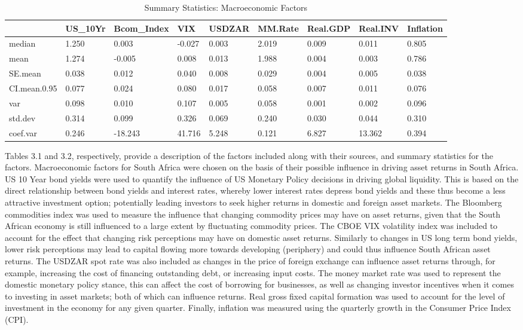\documentclass[11pt,preprint, authoryear]{elsarticle}
\numberwithin{equation}{section}
\numberwithin{figure}{section}
\numberwithin{table}{section}
\begin{document}
\begin{longtable}[t]{l|l|l|l|l|l|l|l|l}
\caption{\label{tab:Descriptive Stats}Summary Statistics: Macroeconomic Factors}\\
\hline
  & US\_10Yr & Bcom\_Index & VIX & USDZAR & MM.Rate & Real.GDP & Real.INV & Inflation\\
\hline
median & 1.250 & 0.003 & -0.027 & 0.003 & 2.019 & 0.009 & 0.011 & 0.805\\
\hline
mean & 1.274 & -0.005 & 0.008 & 0.013 & 1.988 & 0.004 & 0.003 & 0.786\\
\hline
SE.mean & 0.038 & 0.012 & 0.040 & 0.008 & 0.029 & 0.004 & 0.005 & 0.038\\
\hline
CI.mean.0.95 & 0.077 & 0.024 & 0.080 & 0.017 & 0.058 & 0.007 & 0.011 & 0.076\\
\hline
var & 0.098 & 0.010 & 0.107 & 0.005 & 0.058 & 0.001 & 0.002 & 0.096\\
\hline
std.dev & 0.314 & 0.099 & 0.326 & 0.069 & 0.240 & 0.030 & 0.044 & 0.310\\
\hline
coef.var & 0.246 & -18.243 & 41.716 & 5.248 & 0.121 & 6.827 & 13.362 & 0.394\\
\hline
\end{longtable}

Tables 3.1 and 3.2, respectively, provide a description of the factors
included along with their sources, and summary statistics for the
factors. Macroeconomic factors for South Africa were chosen on the basis
of their possible influence in driving asset returns in South Africa. US
10 Year bond yields were used to quantify the influence of US Monetary
Policy decisions in driving global liquidity. This is based on the
direct relationship between bond yields and interest rates, whereby
lower interest rates depress bond yields and these thus become a less
attractive investment option; potentially leading investors to seek
higher returns in domestic and foreign asset markets. The Bloomberg
commodities index was used to measure the influence that changing
commodity prices may have on asset returns, given that the South African
economy is still influenced to a large extent by fluctuating commodity
prices. The CBOE VIX volatility index was included to account for the
effect that changing risk perceptions may have on domestic asset
returns. Similarly to changes in US long term bond yields, lower risk
perceptions may lead to capital flowing more towards developing
(periphery) and could thus influence South African asset returns. The
USDZAR spot rate was also included as changes in the price of foreign
exchange can influence asset returns through, for example, increasing
the cost of financing outstanding debt, or increasing input costs. The
money market rate was used to represent the domestic monetary policy
stance, this can affect the cost of borrowing for businesses, as well as
changing investor incentives when it comes to investing in asset
markets; both of which can influence returns. Real gross fixed capital
formation was used to account for the level of investment in the economy
for any given quarter. Finally, inflation was measured using the
quarterly growth in the Consumer Price Index (CPI).
\end{document}
